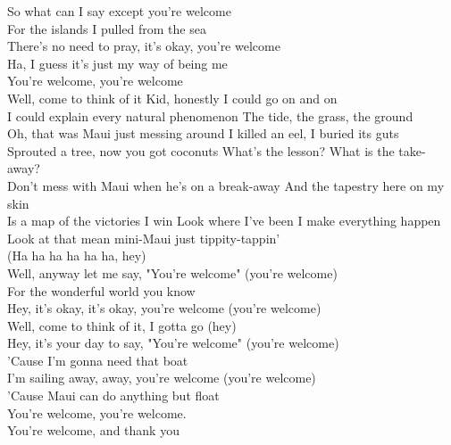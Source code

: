 So what can I say except you're welcome\\
For the islands I pulled from the sea\\
There's no need to pray, it's okay, you're welcome\\
Ha, I guess it's just my way of being me\\
You're welcome, you're welcome\\
Well, come to think of it Kid, honestly I could go on and on\\
I could explain every natural phenomenon The tide, the grass, the ground\\
Oh, that was Maui just messing around I killed an eel, I buried its guts\\
Sprouted a tree, now you got coconuts What's the lesson? What is the take-away?\\
Don't mess with Maui when he's on a break-away And the tapestry here on my skin\\
Is a map of the victories I win Look where I've been I make everything happen\\
Look at that mean mini-Maui just tippity-tappin'\\
(Ha ha ha ha ha  ha, hey)\\
Well, anyway let me say, "You're welcome" (you're welcome)\\
For the wonderful world you know\\
Hey, it's okay, it's okay, you're welcome (you're welcome)\\
Well, come to think of it, I gotta go (hey)\\
Hey, it's your day to say, "You're welcome" (you're welcome)\\
'Cause I'm gonna need that boat\\
I'm sailing away, away, you're welcome (you're welcome)\\
'Cause Maui can do anything but float\\
You're welcome, you're welcome.\\
You're welcome, and thank you \\
